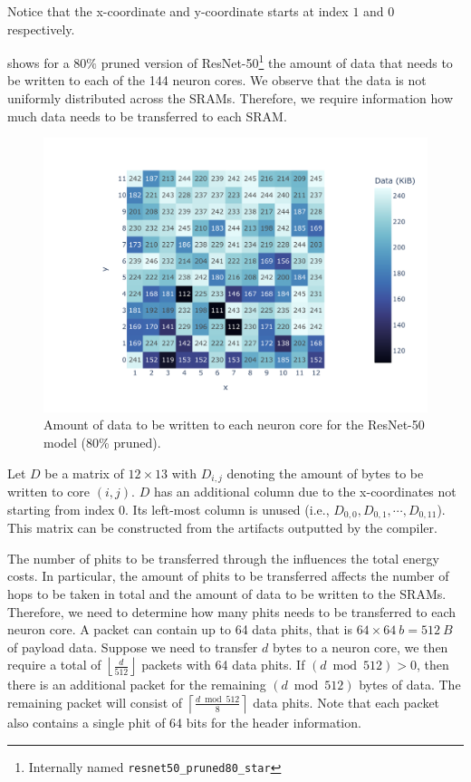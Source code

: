 Notice that the x-coordinate and y-coordinate starts at index $1$ and $0$ respectively.

 shows for a $80\%$ pruned version of ResNet-50\footnote{Internally named \texttt{resnet50\_pruned80\_star}} the amount of data that needs to be written to each of the 144 neuron cores.
We observe that the data is not uniformly distributed across the SRAMs.
Therefore, we require information how much data needs to be transferred to each SRAM.

\begin{figure}[hbtp]
    \centering
    \includegraphics[clip, trim=80 20 10 30, width=0.8\linewidth]{assets/resnet50_coredata_heatmap.pdf}
    \caption{Amount of data to be written to each neuron core for the ResNet-50 model (80\% pruned).}
    \label{fig:model_data_heapmap}
\end{figure}

Let $D$ be a matrix of $12 \times 13$ with $D_{i,j}$ denoting the amount of bytes to be written to core $\left( i,j \right)$.
$D$ has an additional column due to the x-coordinates not starting from index $0$.
Its left-most column is unused (i.e., $D_{0,0}, D_{0,1}, \cdots, D_{0,11}$).
This matrix can be constructed from the artifacts outputted by the compiler.

The number of phits to be transferred through the \confignoc{} influences the total energy costs.
In particular, the amount of phits to be transferred affects the number of hops to be taken in total and the amount of data to be written to the SRAMs.
Therefore, we need to determine how many phits needs to be transferred to each neuron core.
A packet can contain up to 64 data phits, that is $64 \times \SI{64}{b} = \SI{512}{B}$ of payload data.
Suppose we need to transfer $d$ bytes to a neuron core, we then require a total of $\left\lfloor \frac{d}{512} \right\rfloor$ packets with 64 data phits.
If $\left( d \bmod 512 \right) > 0$, then there is an additional packet for the remaining $\left( d \bmod 512 \right)$ bytes of data.
The remaining packet will consist of $\left\lceil \frac{d \bmod 512}{8}\right\rceil$ data phits.
Note that each packet also contains a single phit of 64 bits for the header information.

